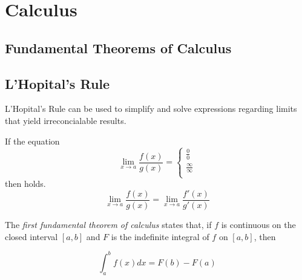 \section{Calculus} \label{app:Calculus}
\subsection{Fundamental Theorems of Calculus} \label{subsec:Fundamental Theorem of Calculus}
\begin{definition} \label{def:1st Fundamental Theorem of Calculus}
\subsection{L'Hopital's Rule}\label{subsec:LHopitals_Rule}
L'Hopital's Rule can be used to simplify and solve expressions regarding limits that yield irreconcialable results.
\begin{lemma}\label{lemma:LHopitals_Rule}
  If the equation
  \begin{equation*}
    \lim\limits_{x \rightarrow a} \frac{f(x)}{g(x)} =
    \begin{cases}
      \frac{0}{0} \\
      \frac{\infty}{\infty} \\
    \end{cases}
  \end{equation*}
  then  holds.
  \begin{equation}\label{eq:LHopitals_Rule}
    \lim\limits_{x \rightarrow a} \frac{f(x)}{g(x)} = \lim\limits_{x \rightarrow a} \frac{f'(x)}{g'(x)}
  \end{equation}
\end{lemma}

  The \emph{first fundamental theorem of calculus} states that, if $f$ is continuous on the closed interval $\left[ a,b \right]$ and $F$ is the indefinite integral of $f$ on $\left[ a,b \right]$, then
  
  \begin{equation} \label{eq:1st Fundamental Theorem of Calculus}
    \int_{a}^{b}f \left( x \right) dx = F \left( b \right) - F \left( a \right)
  \end{equation}
\end{definition}

